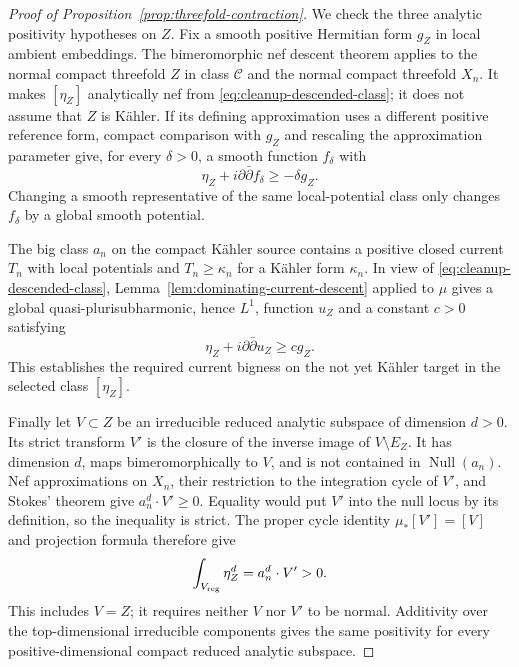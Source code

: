 \begin{proof}[Proof of Proposition~\ref{prop:threefold-contraction}]
We check the three analytic positivity hypotheses on \(Z\).  Fix a
smooth positive Hermitian form \(g_Z\) in local ambient embeddings.
The bimeromorphic nef descent theorem
\cite[Lemma~3.13]{HoeringPeternell2016} applies to the normal compact
threefold \(Z\) in class \(\mathcal C\) and the normal compact
threefold \(X_n\).  It makes \([\eta_Z]\) analytically nef from
\eqref{eq:cleanup-descended-class}; it does not assume that \(Z\) is
K\"ahler.  If its defining approximation uses a different positive
reference form, compact comparison with \(g_Z\) and rescaling the
approximation parameter give, for every \(\delta>0\), a smooth
function \(f_\delta\) with
\begin{equation}\label{eq:cleanup-nef}
 \eta_Z+i\partial\bar\partial f_\delta\geq-\delta g_Z.
\end{equation}
Changing a smooth representative of the same local-potential class only
changes \(f_\delta\) by a global smooth potential.

The big class \(a_n\) on the compact K\"ahler source contains a positive
closed current \(T_n\) with local potentials and
\(T_n\geq\kappa_n\) for a K\"ahler form \(\kappa_n\).  In view of
\eqref{eq:cleanup-descended-class}, Lemma~\ref{lem:dominating-current-descent}
applied to \(\mu\) gives a global quasi-plurisubharmonic, hence
\(L^1\), function \(u_Z\) and a constant \(c>0\) satisfying
\begin{equation}\label{eq:cleanup-big}
 \eta_Z+i\partial\bar\partial u_Z\geq c g_Z.
\end{equation}
This establishes the required current bigness on the not yet K\"ahler
target in the selected class \([\eta_Z]\).

Finally let \(V\subset Z\) be an irreducible reduced analytic subspace
of dimension \(d>0\).  Its strict transform \(V'\) is the closure
of the inverse image of \(V\setminus E_Z\).  It has dimension \(d\),
maps bimeromorphically to \(V\), and is not contained in
\(\operatorname{Null}(a_n)\).  Nef approximations on \(X_n\), their
restriction to the integration cycle of \(V'\), and Stokes' theorem
give \(a_n^d\cdot V'\geq0\).  Equality would put \(V'\) into the
null locus by its definition, so the inequality is strict.  The proper
cycle identity \(\mu_*[V']=[V]\) and projection formula therefore give
\begin{equation}\label{eq:cleanup-positive-intersections}
 \int_{V_{\rm reg}}\eta_Z^d=a_n^d\cdot V'>0.
\end{equation}
This includes \(V=Z\); it requires neither \(V\) nor \(V'\) to be
normal.  Additivity over the top-dimensional irreducible components
gives the same positivity for every positive-dimensional compact reduced
analytic subspace.


\end{proof}
